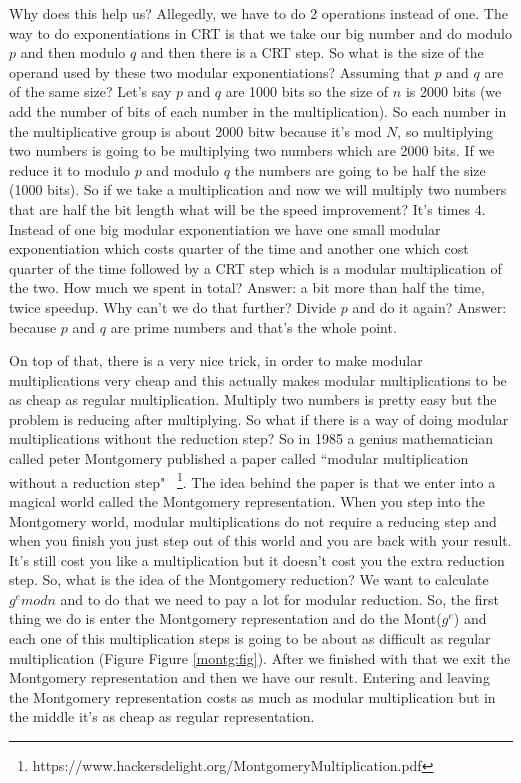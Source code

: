 Why does this help us? Allegedly, we have to do 2 operations instead of one. 
The way to do exponentiations in CRT is that we take our big number 
and do modulo $p$ and then modulo $q$ and then there is a CRT step. 
So what is the size of the operand used by these two modular exponentiations?
Assuming that $p$ and $q$ are of the same size? 
Let's say $p$ and $q$ are 1000 bits so the size of $n$ is 2000 bits
(we add the number of bits of each number in the multiplication).  So each
number in the multiplicative group is about 2000 bitw because it's mod $N$, so
multiplying two numbers is going to be multiplying two numbers which are 2000
bits. If we reduce it to modulo $p$ and modulo $q$ the numbers are going to be
half the size (1000 bits). So if we take a multiplication and now we will
multiply two numbers that are half the bit length what will be the speed
 improvement? 
 It's times 4. Instead of one big modular exponentiation we have one small
modular exponentiation which costs quarter of the time and another one which
cost quarter of the time followed by a CRT step which is a modular
multiplication of the two. 
How much we spent in total? Answer: a bit more than
half the time, twice speedup. 
Why can't we do that further? Divide $p$ and do it
again? Answer: because $p$ and $q$ are prime numbers and that's the whole point.

On top of that, there is a very nice trick, in order to make modular 
multiplications very cheap and this actually makes modular multiplications 
to be as cheap as regular multiplication.
Multiply two numbers is pretty easy but the
problem is reducing after multiplying. So what if there is a way of doing
modular multiplications without the reduction step? So in 1985 a genius
mathematician called peter Montgomery published a paper called ``modular
multiplication without a reduction step"
~\cite{warren2013hacker}\footnote{https://www.hackersdelight.org/MontgomeryMultiplication.pdf}.
The idea behind the paper is that we enter into a magical world 
called the Montgomery representation. When you step into the Montgomery world, 
modular multiplications do not require a reducing step and when you finish
you just step out of this world and you are back with your result. 
It's still cost you like a multiplication but it doesn't cost you the 
extra reduction step. So, what is the idea of the Montgomery reduction? 
We want to calculate \(g^emodn\) and to do that we need to pay a lot 
for modular reduction.
So, the first thing we do is enter the Montgomery representation and do the
Mont(\(g^e\)) and each one of this multiplication steps is going to be about as
difficult as regular multiplication (Figure Figure \ref{montg:fig}). After we
finished with that we exit the Montgomery representation and then we have our
result. Entering and leaving the Montgomery representation costs as much as
modular multiplication but in the middle it's as cheap as regular
representation.

